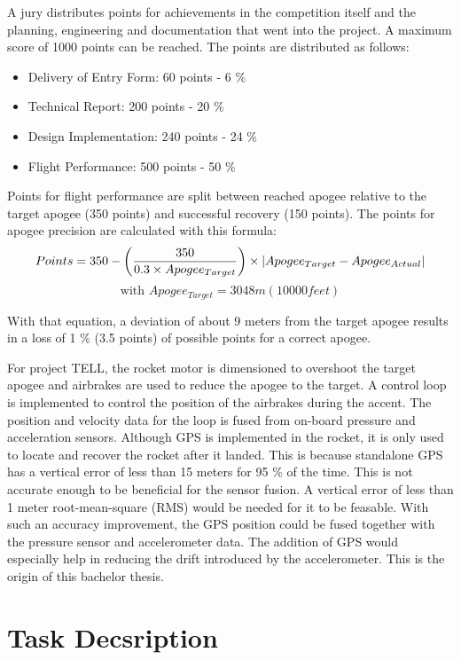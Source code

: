 \vspace{0.5cm}

A jury distributes points for achievements in the competition itself and the planning, engineering and documentation that went into the project.
A maximum score of 1000 points can be reached.
The points are distributed as follows:
\begin{itemize}
 \item Delivery of Entry Form: 60 points - 6 \%
 \item Technical Report: 200 points - 20 \%
 \item Design Implementation: 240 points - 24 \%
 \item Flight Performance: 500 points - 50 \%
\end{itemize}

Points for flight performance are split between reached apogee relative to the target apogee (350 points) and successful recovery (150 points).
The points for apogee precision are calculated with this formula:
$$ Points = 350 - \left( \frac{350}{0.3 \times Apogee_{Target}} \right) \times \abs{Apogee_{Target} - Apogee_{Actual}} $$
$$ \text{with } Apogee_{Target} = 3048m(10000feet)$$ 

With that equation, a deviation of about 9 meters from the target apogee results in a loss of 1 \% (3.5 points) of possible points for a correct apogee. \cite{sac_rules2017}

For project TELL, the rocket motor is dimensioned to overshoot the target apogee and airbrakes are used to reduce the apogee to the target.
A control loop is implemented to control the position of the airbrakes during the accent.
The position and velocity data for the loop is fused from on-board pressure and acceleration sensors.
Although GPS is implemented in the rocket, it is only used to locate and recover the rocket after it landed.
This is because standalone GPS has a vertical error of less than 15 meters for 95 \% of the time. \cite{SPS_Performance}
This is not accurate enough to be beneficial for the sensor fusion.
A vertical error of less than 1 meter root-mean-square (RMS) would be needed for it to be feasable.
With such an accuracy improvement, the GPS position could be fused together with the pressure sensor and accelerometer data.
The addition of GPS would especially help in reducing the drift introduced by the accelerometer.
This is the origin of this bachelor thesis.


\section{Task Decsription}

